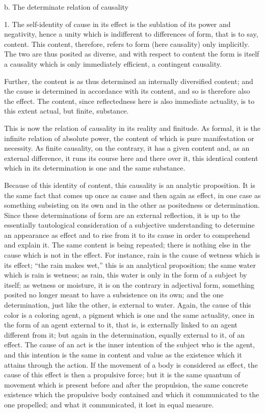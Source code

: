 b. The determinate relation of causality

1. The self-identity of cause in its effect is
the sublation of its power and negativity,
hence a unity which is indifferent
to differences of form,
that is to say, content.
This content, therefore, refers to form
(here causality) only implicitly.
The two are thus posited as diverse,
and with respect to content the form is itself
a causality which is only immediately efficient,
a contingent causality.

Further, the content is as thus determined
an internally diversified content;
and the cause is determined in accordance with its content,
and so is therefore also the effect.
The content, since reflectedness here
is also immediate actuality,
is to this extent actual,
but finite, substance.

This is now the relation of causality
in its reality and finitude.
As formal, it is the infinite relation of absolute power,
the content of which is pure manifestation or necessity.
As finite causality, on the contrary,
it has a given content
and, as an external difference,
it runs its course here and there over it,
this identical content which in its determination
is one and the same substance.

Because of this identity of content,
this causality is an analytic proposition.
It is the same fact that comes up once as cause
and then again as effect,
in one case as something subsisting on its own
and in the other as positedness or determination.
Since these determinations of form
are an external reflection,
it is up to the essentially tautological
consideration of a subjective understanding
to determine an appearance as effect
and to rise from it to its cause
in order to comprehend and explain it.
The same content is being repeated;
there is nothing else in the cause
which is not in the effect.
For instance, rain is the cause of
wetness which is its effect;
“the rain makes wet,”
this is an analytical proposition;
the same water which is rain is wetness;
as rain, this water is only in
the form of a subject by itself;
as wetness or moisture, it is
on the contrary in adjectival form,
something posited no longer meant to have a subsistence on its own;
and the one determination, just like the other, is external to water.
Again, the cause of this color is a coloring agent,
a pigment which is one and the same actuality,
once in the form of an agent external to it,
that is, is externally linked to an agent different from it;
but again in the determination, equally external
to it, of an effect.
The cause of an act is the inner intention of
the subject who is the agent,
and this intention is the same in content and value
as the existence which it attains through the action.
If the movement of a body is considered as effect,
the cause of this effect is then a propulsive force;
but it is the same quantum of movement
which is present before and after the propulsion,
the same concrete existence which the propulsive body
contained and which it communicated to the one propelled;
and what it communicated, it lost in equal measure.

